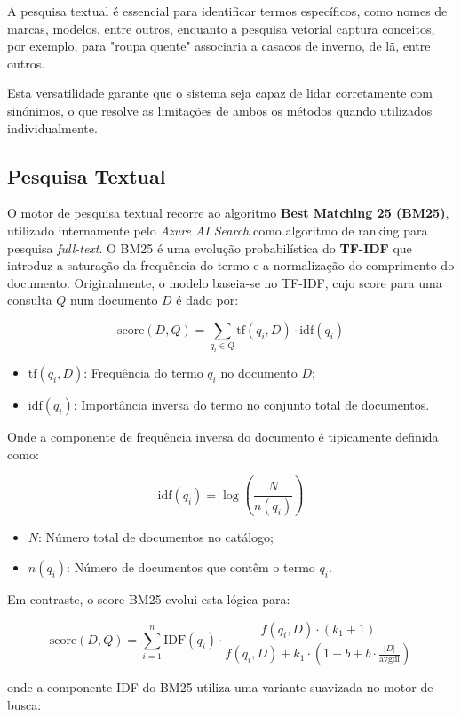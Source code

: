 \documentclass[runningheads]{llncs}
\begin{document}
A pesquisa textual é essencial para identificar termos específicos, como nomes de marcas, modelos, entre outros, enquanto a pesquisa vetorial captura conceitos, por exemplo, para "roupa quente" associaria a casacos de inverno, de lã, entre outros.

Esta versatilidade garante que o sistema seja capaz de lidar corretamente com sinónimos, o que resolve as limitações de ambos os métodos quando utilizados individualmente.

\subsection*{Pesquisa Textual}
O motor de pesquisa textual recorre ao algoritmo \textbf{Best Matching 25 (BM25)}, utilizado internamente pelo \textit{Azure AI Search} como algoritmo de ranking para pesquisa \textit{full-text}. O BM25 é uma evolução probabilística do \textbf{TF-IDF} que introduz a saturação da frequência do termo e a normalização do comprimento do documento. Originalmente, o modelo baseia-se no TF-IDF, cujo score para uma consulta $Q$ num documento $D$ é dado por:

$$\text{score}(D, Q) = \sum_{q_i \in Q} \text{tf}(q_i, D) \cdot \text{idf}(q_i)$$

\begin{itemize}
\item $\text{tf}(q_i, D)$: Frequência do termo $q_i$ no documento $D$;
\item $\text{idf}(q_i)$: Importância inversa do termo no conjunto total de documentos.
\end{itemize}

Onde a componente de frequência inversa do documento é tipicamente definida como:

$$\text{idf}(q_i) = \log \left( \frac{N}{n(q_i)} \right)$$

\begin{itemize}
\item $N$: Número total de documentos no catálogo;
\item $n(q_i)$: Número de documentos que contêm o termo $q_i$.
\end{itemize}

Em contraste, o score BM25 evolui esta lógica para:

$$\text{score}(D, Q) = \sum_{i=1}^{n} \text{IDF}(q_i) \cdot \frac{f(q_i, D) \cdot (k_1 + 1)}{f(q_i, D) + k_1 \cdot (1 - b + b \cdot \frac{|D|}{\text{avgdl}})}$$

onde a componente IDF do BM25 utiliza uma variante suavizada no motor de busca:
\end{document}
